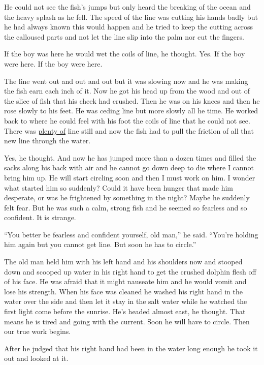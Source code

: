 \documentclass[fontset=ubuntu]{ctexrep}
\begin{document}
He could not see the fish's jumps but only heard the breaking of the ocean
and the heavy \gls{splash} as he fell. The speed of the line was cutting his
hands badly but he had always known this would happen and he tried to keep
the cutting across the \gls{calloused} parts and not let the line slip into
the \gls{palm} nor cut the fingers.

If the boy was here he would wet the coils of line, he thought. Yes. If the
boy were here. If the boy were here.

The line went out and out and out but it was slowing now and he was making
the fish earn each inch of it. Now he got his head up from the wood and out
of the slice of fish that his cheek had \gls{crushed}. Then he was on his
knees and then he rose slowly to his feet. He was \gls{ceding} line but more
slowly all he time. He worked back to where he could feel with his foot the
coils of line that he could not see. There was \uline{plenty of} line still and now
the fish had to pull the \gls{friction} of all that new line through the water.

Yes, he thought. And now he has jumped more than a \gls{dozen} times and
filled the sacks along his back with air and he cannot go down deep to die
where I cannot bring him up. He will start circling soon and then I must
work on him. I wonder what started him so suddenly? Could it have been
hunger that made him desperate, or was he \gls{frightened} by something in
the night? Maybe he suddenly felt fear. But he was such a calm, strong fish
and he seemed so \gls{fearless} and so confident. It is strange.

``You better be fearless and confident yourself, old man,'' he said.
``You're holding him again but you cannot get line. But soon he has to
circle.''

The old man held him with his left hand and his shoulders now and stooped
down and \gls{scoop}ed up water in his right hand to get the crushed dolphin
flesh off of his face. He was afraid that it might \gls{nauseate} him and he
would vomit and lose his strength. When his face was cleaned he washed his
right hand in the water over the side and then let it stay in the salt water
while he watched the first light come before the sunrise. He's headed almost
east, he thought. That means he is tired and going with the current. Soon he
will have to circle. Then our true work begins.

After he judged that his right hand had been in the water long enough he
took it out and looked at it.
\end{document}
